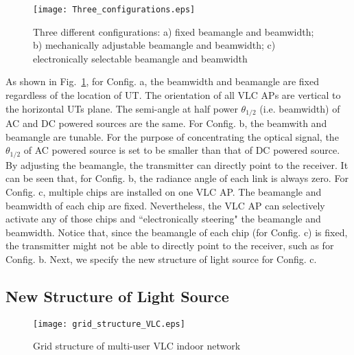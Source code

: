 \documentclass[10pt,journal]{IEEEtran}
\begin{document}
\begin{figure}
\centering
\texttt{[image: Three\_configurations.eps]}
\caption{Three different configurations: a) fixed beamangle and beamwidth; b) mechanically adjustable beamangle and beamwidth; c) electronically selectable beamangle and beamwidth}
\vspace{-5pt}
\label{fig_three_configurations}
\end{figure}

As shown in Fig.~\ref{fig_three_configurations}, for Config. a, the beamwidth and beamangle are fixed regardless of the location of UT. The orientation of all VLC APs are vertical to the horizontal UTs plane. The semi-angle at half power $\theta_{1/2}$ (i.e. beamwidth) of AC and DC powered sources are the same. For Config. b, the beamwith and beamangle are tunable. For the purpose of concentrating the optical signal, the $\theta_{1/2}$ of AC powered source is set to be smaller than that of DC powered source. By adjusting the beamangle, the transmitter can directly point to the receiver. It can be seen that, for Config. b, the radiance angle of each link is always zero. For Config. c, multiple chips are installed on one VLC AP. The beamangle and beamwidth of each chip are fixed. Nevertheless, the VLC AP can selectively activate any of those chips and ``electronically steering" the beamangle and beamwidth. Notice that, since the beamangle of each chip (for Config. c) is fixed, the transmitter might not be able to directly point to the receiver, such as for Config. b. Next, we specify the new structure of light source for Config. c.

\subsection{New Structure of Light Source}

\begin{wrapfigure}{r}{0.21\textwidth}
  \vspace{-5pt}
  \begin{center}
    \texttt{[image: grid\_structure\_VLC.eps]}
  \end{center}
  \vspace{-10pt}
  \caption{Grid structure of multi-user VLC indoor network}
  \vspace{-5pt}
  \label{fig_grid_structure_VLC}
\end{wrapfigure}
\end{document}

